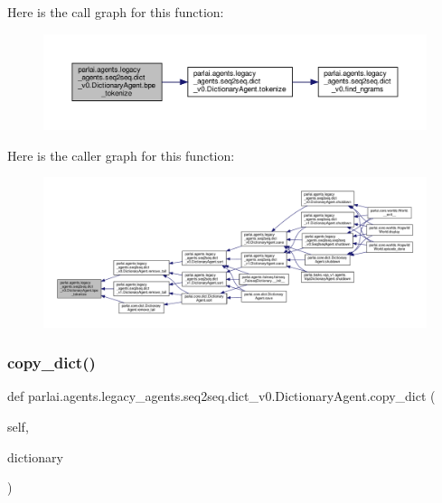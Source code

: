 Here is the call graph for this function\+:
\nopagebreak
\begin{figure}[H]
\begin{center}
\leavevmode
\includegraphics[width=350pt]{classparlai_1_1agents_1_1legacy__agents_1_1seq2seq_1_1dict__v0_1_1DictionaryAgent_a7ccda0fb5cabe49fc68551da6fe03bff_cgraph}
\end{center}
\end{figure}
Here is the caller graph for this function\+:
\nopagebreak
\begin{figure}[H]
\begin{center}
\leavevmode
\includegraphics[width=350pt]{classparlai_1_1agents_1_1legacy__agents_1_1seq2seq_1_1dict__v0_1_1DictionaryAgent_a7ccda0fb5cabe49fc68551da6fe03bff_icgraph}
\end{center}
\end{figure}
\mbox{\label{classparlai_1_1agents_1_1legacy__agents_1_1seq2seq_1_1dict__v0_1_1DictionaryAgent_a56e9c7a8f20652b9dff0fc3c495b6dcf}} 
\subsubsection{\texorpdfstring{copy\+\_\+dict()}{copy\_dict()}}
{\footnotesize\ttfamily def parlai.\+agents.\+legacy\+\_\+agents.\+seq2seq.\+dict\+\_\+v0.\+Dictionary\+Agent.\+copy\+\_\+dict (\begin{DoxyParamCaption}\item[{}]{self,  }\item[{}]{dictionary }\end{DoxyParamCaption})}

